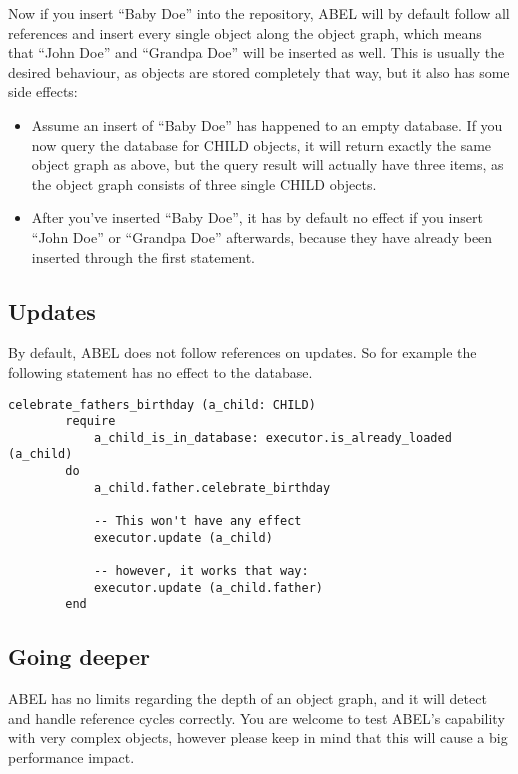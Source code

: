 Now if you insert ``Baby Doe'' into the repository, ABEL will by default follow all references and insert every single object along the object graph, which means that ``John Doe'' and ``Grandpa Doe'' will be inserted as well.
This is usually the desired behaviour, as objects are stored completely that way, but it also has some side effects:

\begin{itemize}
\item Assume an insert of ``Baby Doe'' has happened to an empty database. 
If you now query the database for CHILD objects, it will return exactly the same object graph as above, but the query result will actually have three items, as the object graph consists of three single CHILD objects.
	
\item After you've inserted ``Baby Doe'', it has by default no effect if you insert ``John Doe'' or ``Grandpa Doe'' afterwards, because they have already been inserted through the first statement.
\end{itemize}

\subsection{Updates}

By default, ABEL does not follow references on updates. So for example the following statement has no effect to the database.

\begin{lstlisting}[language=OOSC2Eiffel, captionpos=b, caption={}, label={lst:reference_update}]
	celebrate_fathers_birthday (a_child: CHILD)
		require
			a_child_is_in_database: executor.is_already_loaded (a_child)
		do
			a_child.father.celebrate_birthday

			-- This won't have any effect
			executor.update (a_child)

			-- however, it works that way:
			executor.update (a_child.father)
		end
\end{lstlisting}

\subsection{Going deeper}

ABEL has no limits regarding the depth of an object graph, and it will detect and handle reference cycles correctly. 
You are welcome to test ABEL's capability with very complex objects, however please keep in mind that this will cause a big performance impact.

